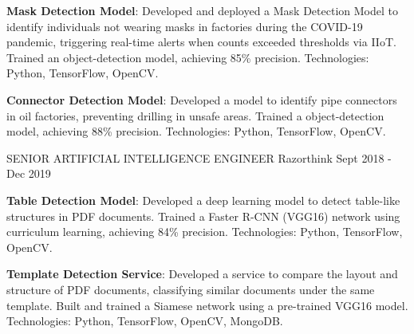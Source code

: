 \begin{cventries}
{\begin{cvitems}
        \item{\textbf{Mask Detection Model}: \newline 
        Developed and deployed a Mask Detection Model to 
        identify individuals not wearing masks in factories during the COVID-19 pandemic, triggering 
        real-time alerts when counts exceeded thresholds via IIoT. \newline
        Trained an  object-detection model, 
        achieving 85\% precision. \newline Technologies: Python, TensorFlow, OpenCV.}        
        \item{\textbf{Connector Detection Model}: \newline Developed a model to identify 
        pipe connectors in oil factories, preventing drilling in unsafe areas. \newline
        Trained a  object-detection model, achieving 88\% precision. \newline
        Technologies: Python, TensorFlow, OpenCV.}
	\end{cvitems}
    }
\vspace{2em} %
  \cventry
    {SENIOR ARTIFICIAL INTELLIGENCE ENGINEER} %
    {Razorthink} %
    {} %
    {Sept 2018 - Dec 2019} %
    {
      \begin{cvitems} %
        \item{\textbf{Table Detection Model}: Developed a deep learning model to 
        detect table-like structures in PDF documents. \newline Trained a Faster 
        R-CNN (VGG16) network using curriculum learning, 
        achieving 84\% precision. \newline Technologies: Python, TensorFlow, OpenCV.}      
        \item{\textbf{Template Detection Service}: Developed a service to compare the 
        layout and structure of PDF documents, classifying similar documents under 
        the same template. \newline Built and trained a Siamese network using a pre-trained 
        VGG16 model. \newline Technologies: Python, TensorFlow, OpenCV, MongoDB.}       

\end{cvitems}}
\end{cventries}
